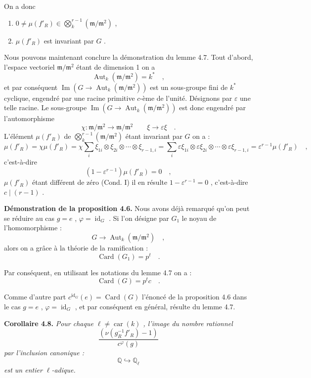 \documentclass[11pt]{article}
\providecommand{\fm}{\mathfrak{m}}
\newcommand{\car}{\operatorname{car}}
\providecommand{\car}{\operatorname{car}}
\providecommand{\id}{\operatorname{id}}
\providecommand{\id}{\operatorname{id}}
\providecommand{\id}{\operatorname{id}}
\providecommand{\Aut}{\operatorname{Aut}}
\providecommand{\car}{\operatorname{car}}
\providecommand{\id}{\operatorname{id}}
\providecommand{\id}{\operatorname{id}}
\providecommand{\im}{\operatorname{Im}}
\providecommand{\bQ}{\mathbb Q}
\providecommand{\fm}{\mathfrak m}
\providecommand{\im}{\operatorname{im}}
\providecommand{\Aut}{\operatorname{Aut}}
\providecommand{\car}{\operatorname{car}}
\providecommand{\id}{\operatorname{id}}
\begin{document}
On a donc
\begin{enumerate}
\item[I)] $0 \neq \mu(f'_R) \in \bigotimes_k^{r-1}(\fm/\fm^2)$ ,
\item[II)] $\mu(f'_R)$ est
invariant par $G$ .
\end{enumerate}

Nous pouvons maintenant conclure la démonstration du lemme 4.7. Tout d'abord, l'espace vectoriel $\fm/\fm^2$ étant de dimension 1 on a
\[
\Aut_k(\fm/\fm^2) = k^* \quad ,
\]
et par conséquent $\im(G \longrightarrow \Aut_k(\fm/\fm^2))$ est un sous-groupe fini de $k^*$ cyclique, engendré par une racine primitive $c$-ème de l'unité. Désignons par $\varepsilon$ une telle racine. Le sous-groupe $\im(G \longrightarrow \Aut_k(\fm/\fm^2))$ est donc engendré par l'automorphisme
\[
\chi : \fm/\fm^2 \longrightarrow \fm/\fm^2 \quad \quad \xi \longrightarrow \varepsilon\xi \quad .
\]
L'élément $\mu(f'_R)$ de $\bigotimes_k^{r-1}(\fm/\fm^2)$ étant invariant par $G$ on a :
\[
\mu(f'_R) = \chi\mu(f'_R) = \chi\sum_i \xi_{1i} \otimes \xi_{2i} \otimes \cdots \otimes \xi_{r-1,i} = \sum_i \varepsilon\xi_{1i} \otimes \varepsilon\xi_{2i} \otimes \cdots \otimes \varepsilon\xi_{r-1,i} = \varepsilon^{r-1}\mu(f'_R) \quad ,
\]
c'est-à-dire
\[
(1 - \varepsilon^{r-1})\mu(f'_R) = 0 \quad ,
\]
$\mu(f'_R)$ étant différent de zéro (Cond. I) il en résulte $1 - \varepsilon^{r-1} = 0$ , c'est-à-dire $c \mid (r-1)$ .

\medskip

\noindent
\textbf{Démonstration de la proposition 4.6.} Nous avons déjà remarqué qu'on peut se réduire au cas $g = e$ , $\varphi = \id_G$ . Si l'on désigne par $G_1$ le noyau de l'homomorphisme :
\[
G \longrightarrow \Aut_k(\fm/\fm^2) \quad ,
\]
alors on a grâce à la théorie de la ramification :
\[
\operatorname{Card}(G_1) = p^t \quad .
\]

Par conséquent, en utilisant les notations du lemme 4.7 on a :
\[
\operatorname{Card}(G) = p^t c \quad .
\]

Comme d'autre part $c^{\id_G}(e) = \operatorname{Card}(G)$ l'énoncé de la proposition 4.6 dans le cas $g = e$ , $\varphi = \id_G$ , et par conséquent en général, résulte du lemme 4.7.

\medskip
\noindent
\textbf{Corollaire 4.8.} \emph{Pour chaque $\ell \neq \car(k)$ , l'image du nombre rationnel
\[
\frac{(\nu(g_R^{-1}f'_R) - 1)}{c^\varphi(g)}
\]
par l'inclusion canonique :
\[
\bQ \hookrightarrow \bQ_\ell
\]
est un entier $\ell$-adique.}
\end{document}
